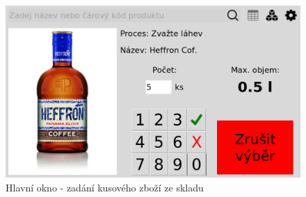 \begin{figure}[H]
    \begin{center}
        \includegraphics[scale=0.4]{obrazky/GUI Numericka klavesnice.png}
    \end{center}
    \caption{Hlavní okno - zadání kusového zboží ze skladu}
    \label{Hlavní okno - evidence kusového zboží ze skladu}
\end{figure}



